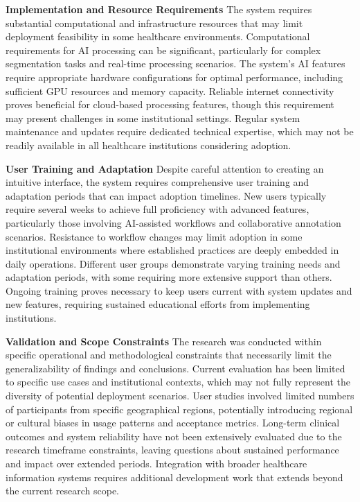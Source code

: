 \textbf{Implementation and Resource Requirements}
The system requires substantial computational and infrastructure resources that may limit deployment feasibility in some healthcare environments. Computational requirements for AI processing can be significant, particularly for complex segmentation tasks and real-time processing scenarios. The system's AI features require appropriate hardware configurations for optimal performance, including sufficient GPU resources and memory capacity. Reliable internet connectivity proves beneficial for cloud-based processing features, though this requirement may present challenges in some institutional settings. Regular system maintenance and updates require dedicated technical expertise, which may not be readily available in all healthcare institutions considering adoption.

\textbf{User Training and Adaptation}
Despite careful attention to creating an intuitive interface, the system requires comprehensive user training and adaptation periods that can impact adoption timelines. New users typically require several weeks to achieve full proficiency with advanced features, particularly those involving AI-assisted workflows and collaborative annotation scenarios. Resistance to workflow changes may limit adoption in some institutional environments where established practices are deeply embedded in daily operations. Different user groups demonstrate varying training needs and adaptation periods, with some requiring more extensive support than others. Ongoing training proves necessary to keep users current with system updates and new features, requiring sustained educational efforts from implementing institutions.

\textbf{Validation and Scope Constraints}
The research was conducted within specific operational and methodological constraints that necessarily limit the generalizability of findings and conclusions. Current evaluation has been limited to specific use cases and institutional contexts, which may not fully represent the diversity of potential deployment scenarios. User studies involved limited numbers of participants from specific geographical regions, potentially introducing regional or cultural biases in usage patterns and acceptance metrics. Long-term clinical outcomes and system reliability have not been extensively evaluated due to the research timeframe constraints, leaving questions about sustained performance and impact over extended periods. Integration with broader healthcare information systems requires additional development work that extends beyond the current research scope.

